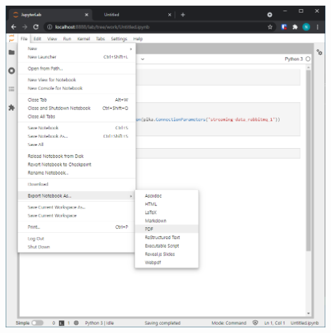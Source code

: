 \documentclass[letterpaper,10pt]{article}
\begin{document}
\begin{enumerate}
\begin{center}
			\includegraphics[width=0.9\textwidth]{export.PNG}
		\end{center}
\end{enumerate}
\end{document}
